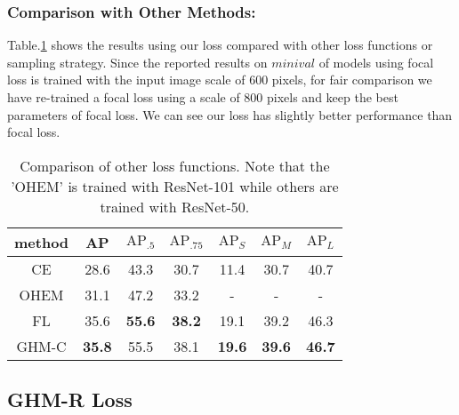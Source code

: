 \documentclass[letterpaper]{article} \usepackage{aaai19}  \usepackage{times}  \usepackage{helvet}  \usepackage{courier}  \usepackage{url}  \usepackage{graphicx}  \usepackage{amsmath,amssymb}
\begin{document}
\subsubsection{Comparison with Other Methods:} Table.\ref{tab:comp} shows the results using our loss compared with other loss functions or sampling strategy. Since the reported results on $minival$ of models using focal loss is trained with the input image scale of 600 pixels, for fair comparison we have re-trained a focal loss using a scale of 800 pixels and keep the best parameters of focal loss.
We can see our loss has slightly better performance than focal loss.
\begin{table}[!ht]
\begin{center}
\begin{tabular}{| c | c  c  c  c  c  c |}
\hline
method & AP & $\text{AP}_{.5}$ & $\text{AP}_{.75}$ & $\text{AP}_{S}$ & $\text{AP}_{M}$ & $\text{AP}_{L}$ \\
\hline
CE & 28.6 & 43.3 & 30.7 & 11.4 & 30.7 & 40.7 \\
OHEM & 31.1 & 47.2 & 33.2 & - & - & - \\
FL & 35.6 & \textbf{55.6} & \textbf{38.2} & 19.1 & 39.2 & 46.3 \\
\hline
GHM-C & \textbf{35.8} & 55.5 & 38.1 & \textbf{19.6} & \textbf{39.6} & \textbf{46.7} \\
\hline
\end{tabular}
\caption{Comparison of other loss functions. Note that the 'OHEM' is trained with ResNet-101 while others are trained with ResNet-50.}
\label{tab:comp}
\end{center}
\end{table}

\subsection{GHM-R Loss}
\end{document}
